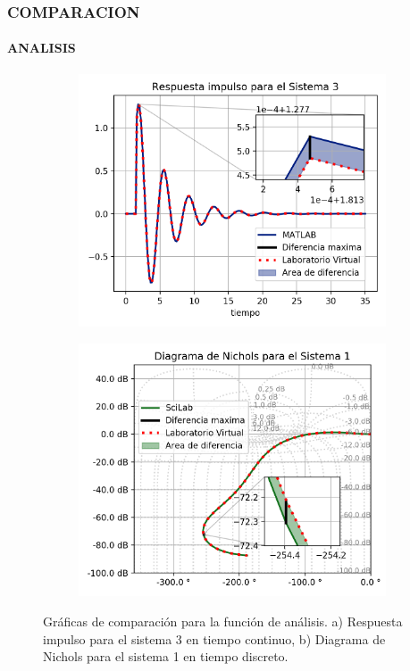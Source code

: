\documentclass[usenames,xcolor={dvipsnames, table}]{beamer}
\begin{document}
\begin{frame}
	\frametitle{COMPARACION}
	\framesubtitle{ANALISIS}
	\vspace{25pt}
	\begin{figure}
		\begin{subfigure}[t]{0.49\linewidth}
			\includegraphics[width=\linewidth]{imagenes/Set3Imp.png}
			\caption{}
		\end{subfigure}
		\hfill
		\begin{subfigure}[t]{0.49\linewidth}
			\includegraphics[width=\linewidth]{imagenes/ScSet1DNichols.png}
			\caption{}
		\end{subfigure}
		\caption{Gráficas de comparación para la función de análisis. a) Respuesta impulso para el sistema 3 en tiempo continuo, b) Diagrama de Nichols para el sistema 1 en tiempo discreto.}
	\end{figure}

\end{frame}
\end{document}
